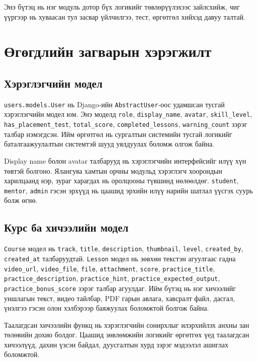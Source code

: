 Энэ бүтэц нь нэг модуль дотор бүх логикийг төвлөрүүлэхээс зайлсхийж, чиг үүргээр нь хуваасан тул засвар үйлчилгээ, тест, өргөтгөл хийхэд давуу талтай.

\section{Өгөгдлийн загварын хэрэгжилт}
\subsection{Хэрэглэгчийн модел}
\texttt{users.models.User} нь Django-ийн \texttt{AbstractUser}-оос удамшсан тусгай хэрэглэгчийн модел юм. Энэ моделд \texttt{role}, \texttt{display\_name}, \texttt{avatar}, \texttt{skill\_level}, \texttt{has\_placement\_test}, \texttt{total\_score}, \texttt{completed\_lessons}, \texttt{warning\_count} зэрэг талбар нэмэгдсэн. Ийм өргөтгөл нь сургалтын системийн тусгай логикийг баталгаажуулалтын системтэй шууд уялдуулах боломж олгож байна.

Display name болон avatar талбарууд нь хэрэглэгчийн интерфейсийг илүү хүн төвтэй болгоно. Ялангуяа хамтын орчны модульд хэрэглэгч хоорондын харилцаанд нэр, зураг харагдах нь оролцооны түвшинд нөлөөлдөг. \texttt{student}, \texttt{mentor}, \texttt{admin} гэсэн эрхүүд нь цаашид эрхийн илүү нарийн шатлал үүсгэх суурь болж өгнө.

\subsection{Курс ба хичээлийн модел}
\texttt{Course} модел нь \texttt{track}, \texttt{title}, \texttt{description}, \texttt{thumbnail}, \texttt{level}, \texttt{created\_by}, \texttt{created\_at} талбаруудтай. \texttt{Lesson} модел нь зөвхөн текстэн агуулгаас гадна \texttt{video\_url}, \texttt{video\_file}, \texttt{file}, \texttt{attachment}, \texttt{score}, \texttt{practice\_title}, \texttt{practice\_description}, \texttt{practice\_hint}, \texttt{practice\_expected\_output}, \texttt{practice\_bonus\_score} зэрэг талбар агуулдаг. Ийм бүтэц нь нэг хичээлийг уншлагын текст, видео тайлбар, PDF гарын авлага, хавсралт файл, дасгал, үнэлгээ гэсэн олон хэлбэрээр баяжуулах боломжтой болгож байна.

Таалагдсан хичээлийн функц нь хэрэглэгчийн сонирхлыг илэрхийлэх анхны зан төлөвийн дохио болдог. Цаашид зөвлөмжийн логикийг өргөтгөх үед таалагдсан хичээлүүд, дахин үзсэн байдал, дуусгалтын хурд зэрэг мэдээлэл ашиглах боломжтой.

